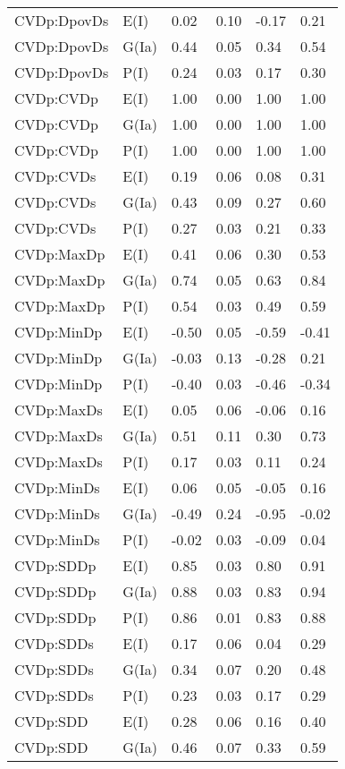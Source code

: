\begin{center}
\begin{longtable}{|p{1.1in}|p{0.7in}|p{0.7in}|p{0.6in}|p{0.6in}|p{0.6in}|}
  CVDp:DpovDs & E(I) & 0.02 & 0.10 & -0.17 & 0.21 \\ 
  CVDp:DpovDs & G(Ia) & 0.44 & 0.05 & 0.34 & 0.54 \\ 
  CVDp:DpovDs & P(I) & 0.24 & 0.03 & 0.17 & 0.30 \\ 
  CVDp:CVDp & E(I) & 1.00 & 0.00 & 1.00 & 1.00 \\ 
  CVDp:CVDp & G(Ia) & 1.00 & 0.00 & 1.00 & 1.00 \\ 
  CVDp:CVDp & P(I) & 1.00 & 0.00 & 1.00 & 1.00 \\ 
  CVDp:CVDs & E(I) & 0.19 & 0.06 & 0.08 & 0.31 \\ 
  CVDp:CVDs & G(Ia) & 0.43 & 0.09 & 0.27 & 0.60 \\ 
  CVDp:CVDs & P(I) & 0.27 & 0.03 & 0.21 & 0.33 \\ 
  CVDp:MaxDp & E(I) & 0.41 & 0.06 & 0.30 & 0.53 \\ 
  CVDp:MaxDp & G(Ia) & 0.74 & 0.05 & 0.63 & 0.84 \\ 
  CVDp:MaxDp & P(I) & 0.54 & 0.03 & 0.49 & 0.59 \\ 
  CVDp:MinDp & E(I) & -0.50 & 0.05 & -0.59 & -0.41 \\ 
  CVDp:MinDp & G(Ia) & -0.03 & 0.13 & -0.28 & 0.21 \\ 
  CVDp:MinDp & P(I) & -0.40 & 0.03 & -0.46 & -0.34 \\ 
  CVDp:MaxDs & E(I) & 0.05 & 0.06 & -0.06 & 0.16 \\ 
  CVDp:MaxDs & G(Ia) & 0.51 & 0.11 & 0.30 & 0.73 \\ 
  CVDp:MaxDs & P(I) & 0.17 & 0.03 & 0.11 & 0.24 \\ 
  CVDp:MinDs & E(I) & 0.06 & 0.05 & -0.05 & 0.16 \\ 
  CVDp:MinDs & G(Ia) & -0.49 & 0.24 & -0.95 & -0.02 \\ 
  CVDp:MinDs & P(I) & -0.02 & 0.03 & -0.09 & 0.04 \\ 
  CVDp:SDDp & E(I) & 0.85 & 0.03 & 0.80 & 0.91 \\ 
  CVDp:SDDp & G(Ia) & 0.88 & 0.03 & 0.83 & 0.94 \\ 
  CVDp:SDDp & P(I) & 0.86 & 0.01 & 0.83 & 0.88 \\ 
  CVDp:SDDs & E(I) & 0.17 & 0.06 & 0.04 & 0.29 \\ 
  CVDp:SDDs & G(Ia) & 0.34 & 0.07 & 0.20 & 0.48 \\ 
  CVDp:SDDs & P(I) & 0.23 & 0.03 & 0.17 & 0.29 \\ 
  CVDp:SDD & E(I) & 0.28 & 0.06 & 0.16 & 0.40 \\ 
  CVDp:SDD & G(Ia) & 0.46 & 0.07 & 0.33 & 0.59 \\ 

\end{longtable}
\end{center}
